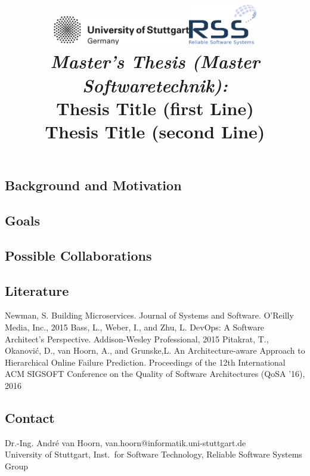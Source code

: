 \documentclass[a4paper,12pt]{article}
\date{}
\title{
\includegraphics[width=6cm]{figures/stuttgart-vector.pdf}\hfill{\includegraphics[width=3cm]{figures/rss_logo.pdf}}
\quad \\ [0.5cm]
{\large \textit{Master's Thesis (Master Softwaretechnik):}} \\ [1mm]
{\Large Thesis Title (first Line) \\ [-3mm] Thesis Title (second Line)}
}
\begin{document}
	

\maketitle

\thispagestyle{empty}

\vspace{-2.5cm}


\subsection*{Background and Motivation}
\blindtext\cite{newman2015}


\subsection*{Goals}
\blindtext\cite{bass2015}


\subsection*{Possible Collaborations}
\blindtext\cite{pitakrat2016}


\subsection*{Literature}
\begingroup
	\renewcommand{\section}[2]{}%
	\begin{thebibliography}{1}
		 Newman, S. Building Microservices. Journal of Systems and Software. O'Reilly Media, Inc., 2015
         Bass, L., Weber, I., and Zhu, L. DevOps: A Software Architect's Perspective. Addison-Wesley Professional, 2015
         Pitakrat, T., Okanovi\'{c}, D., van Hoorn, A., and Grunske,L. An Architecture-aware Approach to Hierarchical Online Failure Prediction. Proceedings of the 12th International ACM SIGSOFT Conference on the Quality of Software Architectures (QoSA '16), 2016
	\end{thebibliography}
\endgroup


\subsection*{Contact}
Dr.-Ing. André van Hoorn, van.hoorn@informatik.uni-stuttgart.de \\
University of Stuttgart, Inst.\ for Software Technology, Reliable Software Systems Group \\
\end{document}
